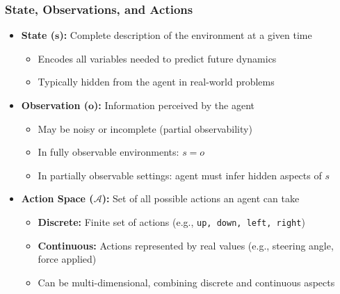 \begin{frame}
    \frametitle{State, Observations, and Actions}
    \begin{itemize}
        \item \textbf{State ($\boldsymbol{s}$):} Complete description of the environment at a given time
        \begin{itemize}\setlength{\itemsep}{4pt}
            \item Encodes all variables needed to predict future dynamics
            \item Typically hidden from the agent in real-world problems
        \end{itemize}
        
        \item \textbf{Observation ($\boldsymbol{o}$):} Information perceived by the agent
        \begin{itemize}\setlength{\itemsep}{4pt}
            \item May be noisy or incomplete (partial observability)
            \item In fully observable environments: $s = o$
            \item In partially observable settings: agent must infer hidden aspects of $s$
        \end{itemize}
        
        \item \textbf{Action Space ($\mathcal{A}$):} Set of all possible actions an agent can take
        \begin{itemize}\setlength{\itemsep}{4pt}
            \item \textbf{Discrete:} Finite set of actions (e.g., \texttt{up, down, left, right})
            \item \textbf{Continuous:} Actions represented by real values (e.g., steering angle, force applied)
            \item Can be multi-dimensional, combining discrete and continuous aspects
        \end{itemize}
    \end{itemize}
\end{frame}



